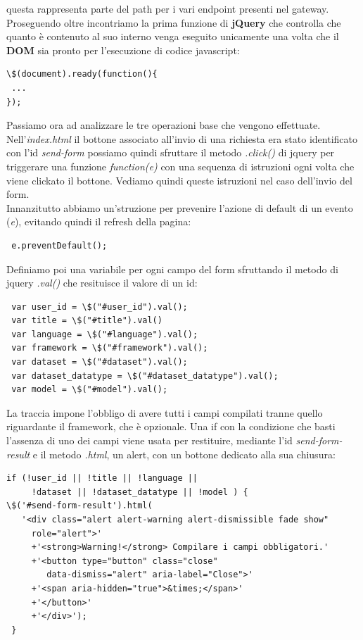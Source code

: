 \documentclass[a4paper,12pt, oneside]{book}
\begin{document}
questa rappresenta parte del path per i vari endpoint presenti nel gateway.\\
Proseguendo oltre incontriamo la prima funzione di \textbf{jQuery} che controlla che quanto
è contenuto al suo interno venga eseguito unicamente una volta che il \textbf{DOM}
sia pronto per l'esecuzione di codice javascript:
\begin{shaded}
\begin{verbatim}
\$(document).ready(function(){
 ...
});
\end{verbatim}
\end{shaded}
Passiamo ora ad analizzare le tre operazioni base che vengono effettuate.\\
Nell'\textit{index.html} il bottone associato all'invio di una richiesta
era stato identificato con l'id \textit{send-form} possiamo quindi sfruttare il metodo
\textit{.click()} di jquery per triggerare una funzione \textit{function(e)
} con una sequenza di istruzioni ogni volta che viene clickato il bottone.
Vediamo quindi queste istruzioni nel caso dell'invio del form.\\
Innanzitutto abbiamo un'struzione per prevenire l'azione di default di un evento (\textit{e}), evitando quindi il refresh della pagina:
\begin{shaded}
\begin{verbatim}
 e.preventDefault();
\end{verbatim}
\end{shaded}
Definiamo poi una variabile per ogni campo del form sfruttando il metodo di jquery
\textit{.val()} che resituisce il valore di un id:
\begin{shaded}
\begin{verbatim}
 var user_id = \$("#user_id").val();
 var title = \$("#title").val()
 var language = \$("#language").val();
 var framework = \$("#framework").val();
 var dataset = \$("#dataset").val();
 var dataset_datatype = \$("#dataset_datatype").val();
 var model = \$("#model").val();
\end{verbatim}
\end{shaded}
La traccia impone l'obbligo di avere tutti i campi compilati tranne quello riguardante
il framework, che è opzionale. Una if con la condizione che basti l'assenza
di uno dei campi viene usata per restituire, mediante l'id \textit{send-form-result}
e il metodo \textit{.html}, un alert, con un bottone dedicato alla sua chiusura:
\begin{shaded}
\begin{verbatim}
if (!user_id || !title || !language ||
     !dataset || !dataset_datatype || !model ) { 
\$('#send-form-result').html(
   '<div class="alert alert-warning alert-dismissible fade show"
     role="alert">'
     +'<strong>Warning!</strong> Compilare i campi obbligatori.'
     +'<button type="button" class="close"
        data-dismiss="alert" aria-label="Close">'
     +'<span aria-hidden="true">&times;</span>'
     +'</button>'
     +'</div>');
 }
\end{verbatim}
\end{shaded}
\end{document}
